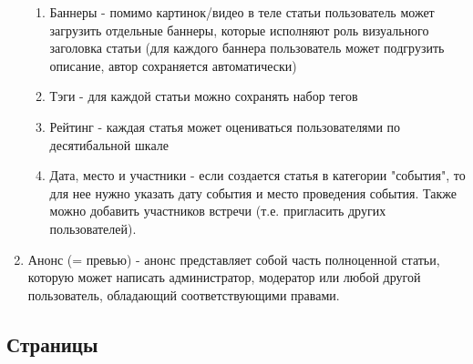 \documentclass[DIV=calc, paper=a4, fontsize=11pt]{scrartcl} %
\begin{document}
\begin{enumerate}
\begin{enumerate}
    \item{Баннеры} - помимо картинок/видео в теле статьи пользователь может загрузить отдельные баннеры, которые исполняют роль визуального заголовка статьи (для каждого баннера пользователь может подгрузить описание, автор сохраняется автоматически)
    \item{Тэги} - для каждой статьи можно сохранять набор тегов
    \item{Рейтинг} - каждая статья может оцениваться пользователями по десятибальной шкале
    \item{Дата, место и участники} - если создается статья в категории "события", то для нее нужно указать дату события и место проведения события. Также можно добавить участников встречи (т.е. пригласить других пользователей). 
    \end{enumerate}
\item \label{announce}{Анонс} (= превью) - анонс представляет собой часть полноценной статьи, которую может написать администратор, модератор или любой другой пользователь, обладающий соответствующими правами.

\end{enumerate}

\subsection{Страницы}
\end{document}
